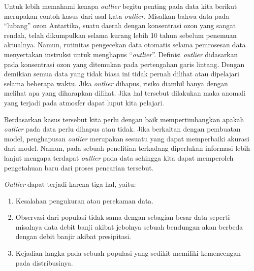 \documentclass[]{book}
\providecommand{\tightlist}{%
  \setlength{\itemsep}{0pt}\setlength{\parskip}{0pt}}
\begin{document}
Untuk lebih memahami kenapa \emph{outlier} begitu penting pada data kita
berikut merupakan contoh kasus dari asal kata \emph{outlier}. Misalkan
bahwa data pada ``lubang'' ozon Antartika, suatu daerah dengan
konsentrasi ozon yang sangat rendah, telah dikumpulkan selama kurang
lebih 10 tahun sebelum penemuan aktualnya. Namun, rutinitas pengecekan
data otomatis selama pemrosesan data menyertakan instruksi untuk
menghapus ``\emph{outlier}''. Definisi \emph{outlier} didasarkan pada
konsentrasi ozon yang ditemukan pada pertengahan garis lintang. Dengan
demikian semua data yang tidak biasa ini tidak pernah dilihat atau
dipelajari selama beberapa waktu. Jika \emph{outlier} dihapus, risiko
diambil hanya dengan melihat apa yang diharapkan dilihat. Jika hal
tersebut dilakukan maka anomali yang terjadi pada atmosfer dapat luput
kita pelajari.

Berdasarkan kasus tersebut kita perlu dengan baik mempertimbangkan
apakah \emph{outlier} pada data perlu dihapus atau tidak. Jika berkaitan
dengan pembuatan model, penghapusan \emph{outlier} merupakan sesuatu
yang dapat memperbaiki akurasi dari model. Namun, pada sebuah penelitian
terkadang diperlukan informasi lebih lanjut mengapa terdapat
\emph{outlier} pada data sehingga kita dapat memperoleh pengetahuan baru
dari proses pencarian tersebut.

\emph{Outlier} dapat terjadi karena tiga hal, yaitu:

\begin{enumerate}
\def\labelenumi{\arabic{enumi}.}
\tightlist
\item
  Kesalahan pengukuran atau perekaman data.
\item
  Observasi dari populasi tidak sama dengan sebagian besar data seperti
  misalnya data debit banji akibat jebolnya sebuah bendungan akan
  berbeda dengan debit banjir akibat presipitasi.
\item
  Kejadian langka pada sebuah populasi yang sedikit memiliki kemencengan
  pada distribusinya.
\end{enumerate}
\end{document}
